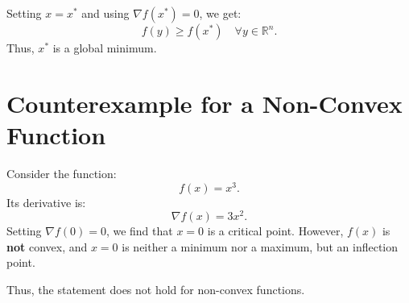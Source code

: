 \documentclass{article}
\begin{document}
\begin{itemize}[label=\textbullet, itemsep=10pt]
Setting $x = x^*$ and using $\nabla f(x^*) = 0$, we get:
\[
    f(y) \geq f(x^*) \quad \forall y \in \mathbb{R}^n.
\]
Thus, $x^*$ is a global minimum.

\section*{Counterexample for a Non-Convex Function}
Consider the function:
\[
    f(x) = x^3.
\]
Its derivative is:
\[
    \nabla f(x) = 3x^2.
\]
Setting $\nabla f(0) = 0$, we find that $x = 0$ is a critical point. However, $f(x)$ is \textbf{not} convex, and $x = 0$ is neither a minimum nor a maximum, but an inflection point.

Thus, the statement does not hold for non-convex functions.

\end{itemize}
\end{document}
